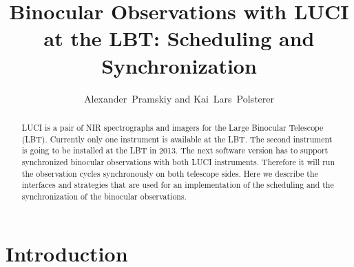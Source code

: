 
\resetcounters




\title{Binocular Observations with LUCI at the LBT: Scheduling and Synchronization}
\author{Alexander~Pramskiy and Kai~Lars~Polsterer
}


\begin{abstract}
LUCI is a pair of NIR spectrographs and imagers for the Large Binocular Telescope (LBT). Currently only one instrument is available at the LBT. The second instrument is going to be installed at the LBT in 2013. The next software version has to support synchronized binocular observations with both LUCI instruments. Therefore it will run the observation cycles synchronously on both telescope sides. Here we describe the interfaces and strategies that are used for an implementation of the scheduling and the synchronization of the binocular observations. 

\end{abstract}

\section{Introduction}

